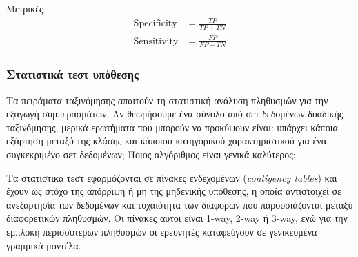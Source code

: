 \begin{minipage}{0.45\textwidth}
	\centering
	\resizebox{\textwidth}{!}{
     	
}
\end{minipage} \qquad
\begin{minipage}{0.45\textwidth}
	\centering Μετρικές
	\begin{align*} 
	\text{Specificity} &=  \frac{TP}{T P + T N} \\ 	
	\text{Sensitivity} &= \frac{FP}{FP + TN} 
	\end{align*}
\end{minipage}
	 
\subsubsection{Στατιστικά τεστ υπόθεσης} \label{section:tests} Τα πειράματα ταξινόμησης απαιτούν τη στατιστική ανάλυση πληθυσμών για την εξαγωγή συμπερασμάτων. Αν θεωρήσουμε ένα σύνολο από σετ δεδομένων δυαδικής ταξινόμησης, μερικά ερωτήματα που μπορούν να προκύψουν είναι: υπάρχει κάποια εξάρτηση μεταξύ της κλάσης και κάποιου κατηγορικού χαρακτηριστικού για ένα συγκεκριμένο σετ δεδομένων; Ποιος αλγόριθμος είναι γενικά καλύτερος;

Τα στατιστικά τεστ εφαρμόζονται σε πίνακες ενδεχομένων (\textit{contigency tables}) και έχουν ως στόχο της απόρριψη ή μη της μηδενικής υπόθεσης, η οποία αντιστοιχεί σε ανεξαρτησία των δεδομένων και τυχαιότητα των διαφορών που παρουσιάζονται μεταξύ διαφορετικών πληθυσμών. Οι πίνακες αυτοι είναι 1-way, 2-way ή 3-way, ενώ για την εμπλοκή περισσότερων πληθυσμών οι ερευνητές καταφεύγουν σε γενικευμένα γραμμικά μοντέλα. \citep{Introduction}

